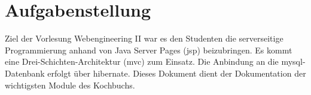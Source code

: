 \chapter{Aufgabenstellung}
Ziel der Vorlesung Webengineering II war es den Studenten die serverseitige Programmierung anhand von Java Server Pages (\acrshort{jsp}) beizubringen. Es kommt eine Drei-Schichten-Architektur (\acrshort{mvc}) zum Einsatz. Die Anbindung an die \gls{mysql}-Datenbank erfolgt über \gls{hibernate}.
Dieses Dokument dient der Dokumentation der wichtigsten Module des Kochbuchs.
